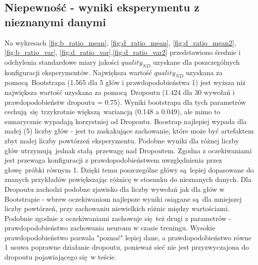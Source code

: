\subsection{Niepewność - wyniki eksperymentu z nieznanymi danymi}

Na wykresach \ref{fig:b_ratio_mean}, \ref{fig:d_ratio_mean}, \ref{fig:d_ratio_mean2}, \ref{fig:b_ratio_var}, \ref{fig:d_ratio_var},\ref{fig:d_ratio_var2} przedstawiono średnie i odchylenia standardowe miary jakości $quality_{ND}$ uzyskane dla poszczególnych konfiguracji eksperymentów. Największa wartość $quality_{ND}$ uzyskana za pomocą Bootstrapa (1.565 dla 5 głów i prawdopodobieństwa 1) jest wyższa niż największa wartość uzyskana za pomocą Dropoutu (1.424 dla 30 wywołań i prawdopodobieństw dropoutu = 0.75). Wyniki bootstrapa dla tych parametrów cechują się trzykrotnie większą wariancją (0.148 a 0.049), ale mimo to sumarycznie wypadają korzystniej od Dropoutu.
Boostrap najlepiej wypada dla małej (5) liczby głów - jest to zaskakujące zachowanie, które może być artefaktem zbyt małej liczby powtórzeń eksperymentu. Podobne wyniki dla różnej liczby głów utrzymują jednak stałą przewagę nad Dropoutem. Zgodna z oczekiwaniami jest przewaga konfiguracji z prawdopodobieństwem uwzględnienia przez głowę próbki równym 1. Dzięki temu poszczególne główy są lepiej dopasowane do znanych przykładów powiększając różnicę w stosunku do nieznanych danych.
Dla Dropoutu zachodzi podobne zjawisko dla liczby wywołań jak dla głów w Bootstrapie - wbrew oczekiwaniom najlepsze wyniki osiągane są dla mniejszej liczby powtórzeń, przy zachowaniu niewielkich różnic między wartościami. Podobnie zgodnie z oczekiwaniami zachowuje się też drugi z parametrów - prawdopodobieństwo zachowania neuronu w czasie treningu. Wysokie prawdopodobieństwo pozwala "poznać" lepiej dane, a prawdopodobieństwo równe 1 usuwa poprawne działanie dropoutu, ponieważ sieć nie jest przyzwyczajona do dropoutu pojawiającego się w teście.

